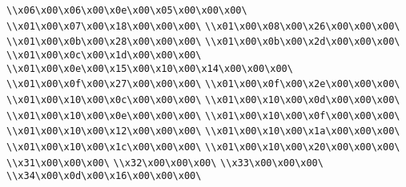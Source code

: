 \verb|\\x06\x00\x06\x00\x0e\x00\x05\x00\x00\x00\|\newline
\verb|\\x01\x00\x07\x00\x18\x00\x00\x00\|\newline
\verb|\\x01\x00\x08\x00\x26\x00\x00\x00\|\newline
\verb|\\x01\x00\x0b\x00\x28\x00\x00\x00\|\newline
\verb|\\x01\x00\x0b\x00\x2d\x00\x00\x00\|\newline
\verb|\\x01\x00\x0c\x00\x1d\x00\x00\x00\|\newline
\verb|\\x01\x00\x0e\x00\x15\x00\x10\x00\x14\x00\x00\x00\|\newline
\verb|\\x01\x00\x0f\x00\x27\x00\x00\x00\|\newline
\verb|\\x01\x00\x0f\x00\x2e\x00\x00\x00\|\newline
\verb|\\x01\x00\x10\x00\x0c\x00\x00\x00\|\newline
\verb|\\x01\x00\x10\x00\x0d\x00\x00\x00\|\newline
\verb|\\x01\x00\x10\x00\x0e\x00\x00\x00\|\newline
\verb|\\x01\x00\x10\x00\x0f\x00\x00\x00\|\newline
\verb|\\x01\x00\x10\x00\x12\x00\x00\x00\|\newline
\verb|\\x01\x00\x10\x00\x1a\x00\x00\x00\|\newline
\verb|\\x01\x00\x10\x00\x1c\x00\x00\x00\|\newline
\verb|\\x01\x00\x10\x00\x20\x00\x00\x00\|\newline
\verb|\\x31\x00\x00\x00\|\newline
\verb|\\x32\x00\x00\x00\|\newline
\verb|\\x33\x00\x00\x00\|\newline
\verb|\\x34\x00\x0d\x00\x16\x00\x00\x00\|\newline
